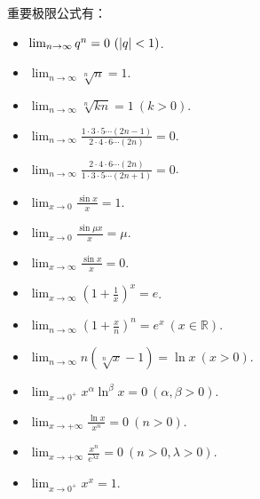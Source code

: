 重要极限公式有：
\begin{itemize}
	\item \(\lim_{n\to\infty} q^n=0\ (\abs{q}<1)\).%
	\item \(\lim_{n\to\infty} \sqrt[n]{n}=1\).%
	\item \(\lim_{n\to\infty} \sqrt[n]{k n} = 1\ (k>0)\).%
	\item \(\lim_{n\to\infty} \frac{1 \cdot 3 \cdot 5 \dotsm (2n-1)}{2 \cdot 4 \cdot 6 \dotsm (2n)} = 0\).%
	\item \(\lim_{n\to\infty} \frac{2 \cdot 4 \cdot 6 \dotsm (2n)}{1 \cdot 3 \cdot 5 \dotsm (2n+1)} = 0\).%
	\item \(\lim_{x\to0} \frac{\sin x}{x} = 1\).%
	\item \(\lim_{x\to0} \frac{\sin \mu x}{x}=\mu\).
	\item \(\lim_{x\to\infty} \frac{\sin x}{x} = 0\).
	\item \(\lim_{x\to\infty} \left(1+\frac1x\right)^x = e\).%
	\item \(\lim_{n\to\infty} \left(1+\frac{x}{n}\right)^n=e^x\ (x\in\mathbb{R})\).%
	\item \(\lim_{n\to\infty} n\left(\sqrt[n]{x}-1\right)=\ln x\ (x>0)\).%
	\item \(\lim_{x\to0^+} x^\alpha \ln^\beta x = 0\ (\alpha,\beta > 0)\).%
	\item \(\lim_{x\to+\infty} \frac{\ln x}{x^n} = 0\ (n>0)\).%
	\item \(\lim_{x\to+\infty} \frac{x^n}{e^{\lambda x}}=0\ (n>0,\lambda>0)\).%
	\item \(\lim_{x\to0^+} x^x = 1\).%
\end{itemize}

